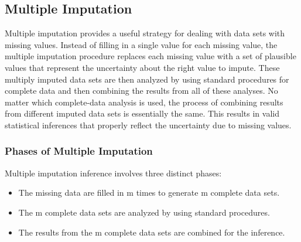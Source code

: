\documentclass[11pt]{article} %
\begin{document}
\subsection{Multiple Imputation}

Multiple imputation provides a useful strategy for dealing
with data sets with missing values. Instead of filling in a
single value for each missing value, the multiple
imputation procedure replaces each missing value with a
set of plausible values that represent the uncertainty about
the right value to impute. These multiply imputed data sets
are then analyzed by using standard procedures for complete
data and then combining the results from all of these analyses.
No matter which complete-data analysis is used, the process
of combining results from different imputed data sets
is essentially the same. This results in valid statistical inferences
that properly reflect the uncertainty due to missing
values.

\subsubsection{Phases of Multiple Imputation}
Multiple imputation inference involves three distinct phases:
\begin{itemize}
\item The missing data are filled in m times to generate m
complete data sets.
\item The m complete data sets are analyzed by using
standard procedures.
\item The results from the m complete data sets are combined
for the inference.
\end{itemize}
\end{document}
